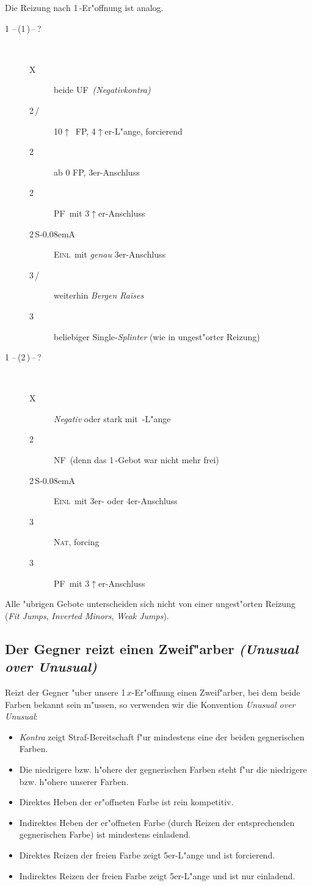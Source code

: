 \documentclass[11pt,german,twocolumn]{scrartcl}
\renewcommand{\Cl}{{\color{ClColor}{\clubs}}}
\renewcommand{\Di}{{\color{DiColor}{\sdiamonds}}}
\renewcommand{\He}{{\color{HeColor}{\shearts}}}
\renewcommand{\Sp}{{\color{SpColor}{\spades}}}
\def\pik{\,\Sp}
\def\coe{\,\He}
\def\kar{\,\Di}
\def\tre{\,\Cl}
\def\ka{\Di}
\def\pl{$\uparrow$}
\def\ufa{\textsf{UF}}
\def\sa{\textsf{S\kern-0.08emA}}
\def\SA{\,\sa}
\def\kontra{\textsf{X}}
\def\sep{\,--\,}
\newcommand{\conv}[1]{\emph{#1}}
\def\nat{\textsc{Nat}}
\def\pf{\textsc{PF}}
\def\inv{\textsc{Einl}}
\def\nf{\textsc{NF}}
\def\bdsc{\begin{description}}
\def\edsc{\end{description}}
\begin{document}
Die Reizung nach 1\kar-Er"offnung ist analog.

\bdsc
\item[1\coe\sep(1\pik)\sep?]~
\bdsc
\item[\kontra] beide \ufa\ \conv{(Negativkontra)}
\item[2\tre/\ka] 10\pl\ FP, 4\pl{}er-L"ange, forcierend
\item[2\coe] ab 0 FP, 3er-Anschluss
\item[2\pik] \pf\ mit 3\pl{}er-Anschluss
\item[2\SA] \inv\ mit \emph{genau} 3er-Anschluss
\item[3\tre/\ka] weiterhin \conv{Bergen Raises}
\item[3\pik] beliebiger Single-\conv{Splinter} (wie in ungest"orter
  Reizung)
\edsc
\item[1\coe\sep(2\kar)\sep?]~
\bdsc
\item[\kontra] \conv{Negativ} oder stark mit \pik-L"ange
\item[2\pik] \nf\ (denn das 1\pik-Gebot war nicht mehr frei)
\item[2\SA] \inv\ mit 3er- oder 4er-Anschluss
\item[3\tre] \nat, forcing
\item[3\kar] \pf\ mit 3\pl{}er-Anschluss
\edsc
\edsc

Alle "ubrigen Gebote unterscheiden sich nicht von einer ungest"orten
Reizung (\conv{Fit Jumps}, \conv{Inverted Minors}, \conv{Weak Jumps}).

\subsection{Der Gegner reizt einen Zweif"arber \conv{(Unusual over
    Unusual)}}

Reizt der Gegner "uber unsere 1\,$x$-Er"offnung einen Zweif"arber, bei
dem beide Farben bekannt sein m"ussen, so verwenden wir die Konvention
\conv{Unusual over Unusual}:
\begin{itemize}
\item \conv{Kontra} zeigt Straf-Bereitschaft f"ur mindestens eine der
  beiden gegnerischen Farben.
\item Die niedrigere bzw. h"ohere der gegnerischen Farben steht
  f"ur die niedrigere bzw. h"ohere unserer Farben.
\item Direktes Heben der er"offneten Farbe ist rein kompetitiv.
\item Indirektes Heben der er"offneten Farbe (durch Reizen der
  entsprechenden gegnerischen Farbe) ist mindestens einladend.
\item Direktes Reizen der freien Farbe zeigt 5er-L"ange und ist
  forcierend.
\item Indirektes Reizen der freien Farbe zeigt 5er-L"ange und ist nur
  einladend.
\end{itemize}
\end{document}
